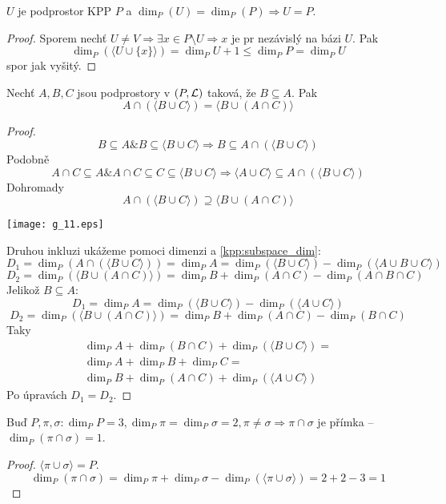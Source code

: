 \begin{observation}\label{kpp:subspace_dim}
	$U$ je podprostor KPP $P$ a $\dim_P(U) = \dim_P(P) \Rightarrow U = P$.
\end{observation}
\begin{proof}
	Sporem nechť $U \ne V \Rightarrow \exists x \in P \setminus U \Rightarrow x$ je pr nezávislý na bázi $U$.
	Pak
	\[ \dim_P(\langle U \cup \{ x \} \rangle) = \dim_P U + 1 \leq \dim_P P = \dim_P U \]
	spor jak vyšitý.
\end{proof}

\begin{theorem}[Modularita]
    Nechť $A,B,C$ jsou podprostory v $(P, \operatorname{\mathcal{L}})$ taková, že $B \subseteq A$.
    Pak
    \[ A \cap (\langle B \cup C \rangle) = \langle B \cup (A \cap C) \rangle \]
\end{theorem}
\begin{proof}
	\[ B \subseteq A \& B \subseteq \langle B \cup C \rangle \Rightarrow B \subseteq A \cap (\langle B \cup C \rangle) \]
	Podobně
	\[A \cap C \subseteq A \& A \cap C \subseteq C \subseteq \langle B \cup C \rangle \Rightarrow \langle A \cup C \rangle \subseteq A \cap (\langle B \cup C \rangle) \]
	Dohromady
    \[ A \cap (\langle B \cup C \rangle) \supseteq \langle B \cup (A \cap C) \rangle \]

    	\texttt{[image: g\_11.eps]}

	Druhou inkluzi ukážeme pomoci dimenzi a \cref{kpp:subspace_dim}:
	\[ D_1 = \dim_P(A \cap (\langle B \cup C \rangle)) = \dim_P A = \dim_P(\langle B \cup C \rangle) - \dim_P(\langle A \cup B \cup C \rangle) \]
	\[ D_2 = \dim_P(\langle B \cup (A \cap C) \rangle) = \dim_P B + \dim_P(A \cap C) - \dim_P(A \cap B \cap C) \]
	Jelikož $B \subseteq A$:
	\[ D_1 = \dim_P A = \dim_P(\langle B \cup C \rangle) - \dim_P(\langle A \cup C \rangle) \]
	\[ D_2 = \dim_P(\langle B \cup (A \cap C) \rangle) = \dim_P B + \dim_P(A \cap C) - \dim_P(B \cap C) \]
	Taky
	\begin{gather*}
	\dim_P A + \dim_P(B \cap C) + \dim_P(\langle B \cup C \rangle) = \\
	\dim_P A + \dim_P B + \dim_P C = \\
	\dim_P B + \dim_P(A \cap C) + \dim_P(\langle A \cup C \rangle)
	\end{gather*}
	Po úpravách $D_1 = D_2$.
\end{proof}

\begin{consequence}
    Buď $P,\pi,\sigma: \dim_P P=3, \dim_P\pi = \dim_P\sigma=2, \pi\neq\sigma\Rightarrow \pi\cap\sigma$ je přímka -- $\dim_P(\pi\cap\sigma)=1$.
\end{consequence}
\begin{proof}
	$\langle \pi \cup \sigma \rangle = P$.
	\[ \dim_P(\pi \cap \sigma) = \dim_P \pi + \dim_P \sigma - \dim_P (\langle \pi \cup \sigma \rangle) = 2 + 2 - 3 = 1 \]
\end{proof}

